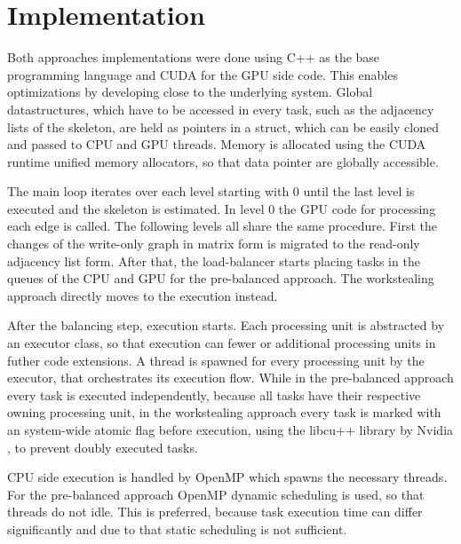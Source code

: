 
\section{Implementation}
Both approaches implementations were done using C++ as the base programming language and CUDA for the GPU side code. This enables optimizations by developing close to the underlying system. Global datastructures, which have to be accessed in every task, such as the adjacency lists of the skeleton, are held as pointers in a struct, which can be easily cloned and passed to CPU and GPU threads. Memory is allocated using the CUDA runtime unified memory allocators, so that data pointer are globally accessible.

The main loop iterates over each level starting with 0 until the last level is executed and the skeleton is estimated. In level 0 the GPU code for processing each edge is called. The following levels all share the same procedure. First the changes of the write-only graph in matrix form is migrated to the read-only adjacency list form. After that, the load-balancer starts placing tasks in the queues of the CPU and GPU for the pre-balanced approach. The workstealing approach directly moves to the execution instead.

After the balancing step, execution starts. Each processing unit is abstracted by an executor class, so that execution can fewer or additional processing units in futher code extensions. A thread is spawned for every processing unit by the executor, that orchestrates its execution flow. While in the pre-balanced approach every task is executed independently, because all tasks have their respective owning processing unit, in the workstealing approach every task is marked with an system-wide atomic flag before execution, using the libcu++ library by Nvidia \cite{NVIDIALibcudacxx2021}, to prevent doubly executed tasks.

CPU side execution is handled by OpenMP which spawns the necessary threads. For the pre-balanced approach OpenMP dynamic scheduling is used, so that threads do not idle. This is preferred, because task execution time can differ significantly and due to that static scheduling is not sufficient.

